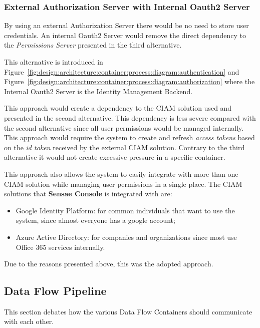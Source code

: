 \subsubsection*{External Authorization Server with Internal Oauth2 Server}
\label{subsubsec:design:alternatives:auth:externalauthinternaloauth}

By using an external Authorization Server there would be no need to store user credentials. An internal Oauth2 Server would remove the direct dependency to the \textit{Permissions Server} presented in the third alternative.

This alternative is introduced in Figure~\ref{fig:design:architecture:container:process:diagram:authentication} and Figure~\ref{fig:design:architecture:container:process:diagram:authorization} where the Internal Oauth2 Server is the Identity Management Backend.

This approach would create a dependency to the \gls{CIAM} solution used and presented in the second alternative. This dependency is less severe compared with the second alternative since all user permissions would be managed internally.
This approach would require the system to create and refresh \textit{access tokens} based on the \textit{id token} received by the external \gls{CIAM} solution. Contrary to the third alternative it would not create excessive pressure in a specific container.

This approach also allows the system to easily integrate with more than one \gls{CIAM} solution while managing user permissions in a single place. The \gls{CIAM} solutions that \textbf{Sensae Console} is integrated with are:

\begin{itemize}
   \item Google Identity Platform: for common individuals that want to use the system, since almost everyone has a google account; 
   \item Azure Active Directory: for companies and organizations since most use Office 365 services internally.
\end{itemize}

Due to the reasons presented above, this was the adopted approach.

\subsection{Data Flow Pipeline}
\label{subsec:design:alternatives:flow}

This section debates how the various Data Flow Containers should communicate with each other. 

